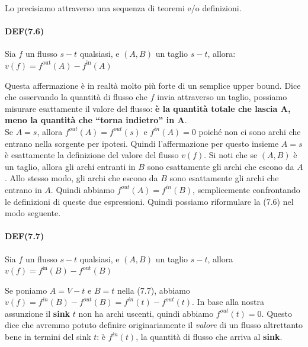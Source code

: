 Lo precisiamo attraverso una sequenza di teoremi e/o definizioni.

\paragraph{DEF(7.6)}

\begin{myblockquote}
	Sia $f$ un flusso $s-t$ qualsiasi, e $(A, B)$ un taglio $s-t$, allora:
	$
		v(f) = f^{\text{out}}(A) - f^{\text{in}}(A)
	$
\end{myblockquote}

Questa affermazione è in realtà molto più forte di un semplice upper
bound. Dice che osservando la quantità di flusso che $f$ invia
attraverso un taglio, possiamo misurare esattamente il valore del
flusso: \textbf{è la quantità totale che lascia A, meno la quantità che
	``torna indietro'' in A}.\\

Se $A = {s}$, allora $f^{out}(A) = f^{out}(s)$ e $f^{in}(A) = 0$
poiché non ci sono archi che entrano nella sorgente per ipotesi. Quindi
l'affermazione per questo insieme $A = {s}$ è esattamente la
definizione del valore del flusso $v(f)$. Si noti che se $(A, B)$ è
un taglio, allora gli archi entranti in $B$ sono esattamente gli archi
che escono da $A$. Allo stesso modo, gli archi che escono da $B$
sono esattamente gli archi che entrano in $A$. Quindi abbiamo
$f^{out}(A) = f^{in}(B)$, semplicemente confrontando le definizioni di
queste due espressioni. Quindi possiamo riformulare la (7.6) nel modo
seguente.

\paragraph{DEF(7.7)}

\begin{myblockquote}
	Sia $f$ un flusso $s-t$ qualsiasi, e $(A, B)$ un taglio $s-t$, allora
	$
		v(f) = f^{\text{in}}(B) - f^{\text{out}}(B)
	$
\end{myblockquote}

Se poniamo $A = V - {t}$ e $B = {t}$ nella (7.7), abbiamo
$v(f) = f^{in}(B) - f^{out}(B) = f^{in}(t) - f^{out}(t)$. In base alla
nostra assunzione il \textbf{sink} $t$ non ha archi uscenti, quindi
abbiamo $f^{out}(t) = 0$. Questo dice che avremmo potuto definire
originariamente il \emph{valore} di un flusso altrettanto bene in
termini del sink $t$: è $f^{in}(t)$, la quantità di flusso che
arriva al \textbf{sink}.\\

